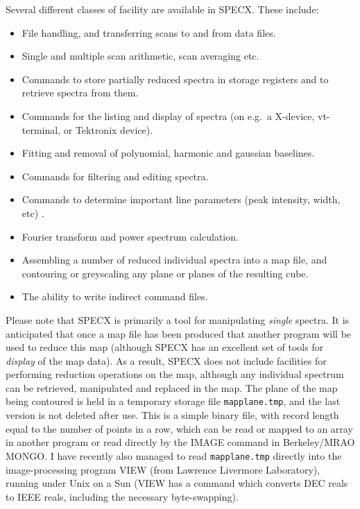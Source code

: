 \documentclass[11pt,twoside]{report}
\begin{document}
Several different classes of facility are available in SPECX. These include:
\begin{itemize}
\item File handling, and transferring scans to and from data files.
\item Single and multiple scan arithmetic, scan averaging etc.
\item Commands to store partially reduced spectra in storage registers and to
      retrieve spectra from them.
\item Commands for the listing and display of spectra (on e.g.\ a X-device,
      vt-terminal, or Tektronix device).
\item Fitting and removal of polynomial, harmonic and gaussian baselines.
\item Commands for filtering and editing spectra.
\item Commands to determine important line parameters (peak intensity, width,
      etc) .
\item Fourier transform and power spectrum calculation.
\item Assembling a number of reduced individual spectra into a map file,
      and contouring or greyscaling any plane or planes of the resulting cube.
\item The ability to write indirect command files.
\end{itemize}

Please note that SPECX is primarily a tool for manipulating {\em single}
spectra. It is anticipated that once a map file has been
produced that another program will be used to reduce this map (although SPECX
has an excellent set of tools for {\em display} of the map
data). As a result, SPECX does not include facilities for performing reduction
operations on the map, although any individual spectrum can be retrieved,
manipulated and replaced in the map. The plane of the map being contoured is
held in a temporary storage file
\texttt{mapplane.tmp}, and the last version is
not deleted after use. This is a simple binary file, with record length equal
to the number of points in a row, which can be read or mapped to an array in
another program or read directly by the IMAGE
 command in Berkeley/MRAO MONGO. I
have recently also managed to read \texttt{mapplane.tmp} directly into the
image-processing program VIEW (from Lawrence Livermore Laboratory), running
under Unix on a Sun (VIEW has a command which converts DEC reals to IEEE reals,
including the necessary byte-swapping). 
\end{document}
